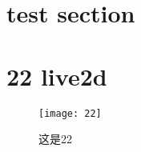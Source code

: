 \section{test section}


\section{22 live2d}

\begin{figure}
    \texttt{[image: 22]}
    \caption{这是22}
\end{figure}

